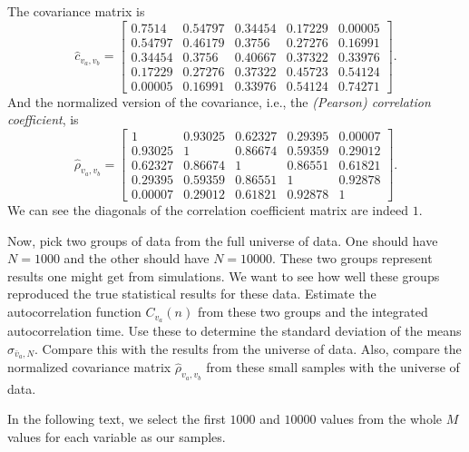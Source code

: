 \Answer{}
The covariance matrix is
%
\begin{equation}
    \hat{c}_{v_a, v_b} =
    \begin{bmatrix}
        0.7514  & 0.54797 & 0.34454 & 0.17229 & 0.00005 \\
        0.54797 & 0.46179 & 0.3756  & 0.27276 & 0.16991 \\
        0.34454 & 0.3756  & 0.40667 & 0.37322 & 0.33976 \\
        0.17229 & 0.27276 & 0.37322 & 0.45723 & 0.54124 \\
        0.00005 & 0.16991 & 0.33976 & 0.54124 & 0.74271
    \end{bmatrix}.
\end{equation}
%
And the normalized version of the covariance, i.e., the
\emph{(Pearson) correlation coefficient}, is
%
\begin{equation}
    \hat{\rho}_{v_a, v_b} =
    \begin{bmatrix}
        1       & 0.93025 & 0.62327 & 0.29395 & 0.00007 \\
        0.93025 & 1       & 0.86674 & 0.59359 & 0.29012 \\
        0.62327 & 0.86674 & 1       & 0.86551 & 0.61821 \\
        0.29395 & 0.59359 & 0.86551 & 1       & 0.92878 \\
        0.00007 & 0.29012 & 0.61821 & 0.92878 & 1
    \end{bmatrix}.
\end{equation}
%
We can see the diagonals of the correlation coefficient matrix are indeed \(1\).


 Now, pick two groups of data from the full universe of data. One should have
\(N = 1000\) and the other should have \(N = 10000\). These two groups represent results one
might get from simulations. We want to see how well these groups reproduced the true
statistical results for these data.
Estimate the autocorrelation function \(C_{v_a}(n)\) from these two groups and the integrated
autocorrelation time. Use these to determine the standard deviation of the means
\(\sigma_{\bar{v}_a,N}\). Compare this with the results from the universe of data. Also,
compare the normalized covariance matrix \(\hat{\rho}_{v_a, v_b}\) from these small samples
with the universe of data.

\Answer{}
In the following text, we select the first \(1000\) and \(10000\) values from the whole
\(M\) values for each variable as our samples.

